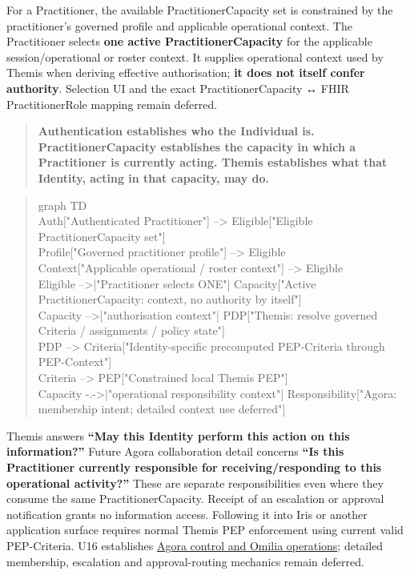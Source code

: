 For a Practitioner, the available PractitionerCapacity set is constrained by
the practitioner's governed profile and applicable operational context. The
Practitioner selects \textbf{one active PractitionerCapacity} for the applicable
session/operational or roster context. It supplies operational context used by
Themis when deriving effective authorisation; \textbf{it does not itself confer authority}.
Selection UI and the exact PractitionerCapacity ↔ FHIR PractitionerRole mapping
remain deferred.



\begin{quote}


\textbf{Authentication establishes who the Individual is. PractitionerCapacity
establishes the capacity in which a Practitioner is currently acting. Themis
establishes what that Identity, acting in that capacity, may do.}



\end{quote}


\begin{quote}\small\ttfamily
graph TD\\
    Auth["Authenticated Practitioner"] --> Eligible["Eligible PractitionerCapacity set"]\\
    Profile["Governed practitioner profile"] --> Eligible\\
    Context["Applicable operational / roster context"] --> Eligible\\
    Eligible -->|"Practitioner selects ONE"| Capacity["Active PractitionerCapacity: context, no authority by itself"]\\
    Capacity -->|"authorisation context"| PDP["Themis: resolve governed Criteria / assignments / policy state"]\\
    PDP --> Criteria["Identity-specific precomputed PEP-Criteria through PEP-Context"]\\
    Criteria --> PEP["Constrained local Themis PEP"]\\
    Capacity -.->|"operational responsibility context"| Responsibility["Agora: membership intent; detailed context use deferred"]\\

\end{quote}


Themis answers \textbf{“May this Identity perform this action on this information?”}
Future Agora collaboration detail concerns \textbf{“Is this Practitioner currently
responsible for receiving/responding to this operational activity?”} These are
separate responsibilities even where they consume the same PractitionerCapacity.
Receipt of an escalation or approval notification grants no information access.
Following it into Iris or another application surface requires normal Themis PEP
enforcement using current valid PEP-Criteria. U16 establishes
\hyperref[element:d1c4053e68384080b8eb79d2008632ba]{Agora control and Omilia operations};
detailed membership, escalation and approval-routing mechanics remain deferred.


